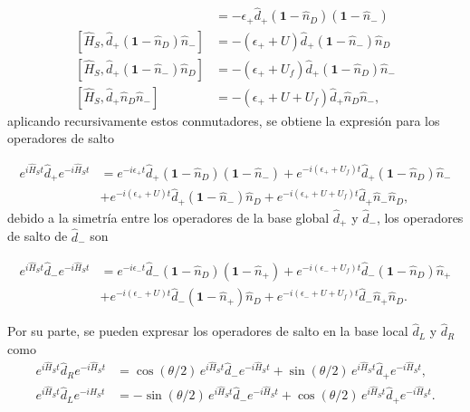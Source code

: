 \begin{appendixs}
\begin{align*}
    [\hat{H}_{S},\hat{d}_{+}(\textbf{1}-\hat{n}_{D})(\textbf{1} - \hat{n}_{-})] & = - \epsilon_{+}\hat{d}_{+}(\textbf{1}-\hat{n}_{D})(\textbf{1} - \hat{n}_{-}) \\
    [\hat{H}_{S},\hat{d}_{+}(\textbf{1}-\hat{n}_{D})\hat{n}_{-}] & = - (\epsilon_{+} + U)\hat{d}_{+}(\textbf{1} - \hat{n}_{-})\hat{n}_{D} \\
    [\hat{H}_{S},\hat{d}_{+}(\textbf{1}-\hat{n}_{-})\hat{n}_{D}] & = - (\epsilon_{+} + U_{f})\hat{d}_{+}(\textbf{1} - \hat{n}_{D})\hat{n}_{-} \\
    [\hat{H}_{S},\hat{d}_{+}\hat{n}_{D}\hat{n}_{-}] & = - (\epsilon_{+} + U + U_{f})\hat{d}_{+}\hat{n}_{D}\hat{n}_{-}, 
\end{align*}
aplicando recursivamente estos conmutadores, se obtiene la expresión para los operadores de salto 

\begin{align*}
    e^{i \hat{H}_{S}t}\hat{d}_{+}e^{-i\hat{H}_{S}t} & = e^{-i\epsilon_{+}t}\hat{d}_{+}(\textbf{1}-\hat{n}_{D})(\textbf{1}-\hat{n}_{-}) + e^{-i(\epsilon_{+}+U_{f})t} \hat{d}_{+}(\textbf{1}-\hat{n}_{D})\hat{n}_{-} \\
    & + e^{-i(\epsilon_{+}+U)t}\hat{d}_{+}(\textbf{1}-\hat{n}_{-})\hat{n}_{D} + e^{-i(\epsilon_{+}+U+U_{f})t}\hat{d}_{+}\hat{n}_{-}\hat{n}_{D},
\end{align*}
debido a la simetría entre los operadores de la base global $\hat{d}_{+}$ y $\hat{d}_{-}$, los operadores de salto de $\hat{d}_{-}$ son

\begin{align*}
    e^{i \hat{H}_{S}t}\hat{d}_{-}e^{-i\hat{H}_{S}t} & = e^{-i\epsilon_{-}t}\hat{d}_{-}(\textbf{1}-\hat{n}_{D})(\textbf{1}-\hat{n}_{+}) + e^{-i(\epsilon_{-}+U_{f})t} \hat{d}_{-}(\textbf{1}-\hat{n}_{D})\hat{n}_{+} \\
    & + e^{-i(\epsilon_{-}+U)t}\hat{d}_{-}(\textbf{1}-\hat{n}_{+})\hat{n}_{D} + e^{-i(\epsilon_{-}+U+U_{f})t}\hat{d}_{-}\hat{n}_{+}\hat{n}_{D}.
\end{align*}

Por su parte, se pueden expresar los operadores de salto en la base local $\hat{d}_{L}$ y $\hat{d}_{R}$ como 
\begin{align*}
    e^{i\hat{H}_{S}t}\hat{d}_{R}e^{-i\hat{H}_{S}t} & = \cos(\theta/2)\, e^{i\hat{H}_{S}t}\hat{d}_{-}e^{-i\hat{H}_{S}t} + \sin(\theta/2)\, e^{i\hat{H}_{S}t}\hat{d}_{+}e^{-i\hat{H}_{S}t}, \\
    e^{i\hat{H}_{S}t}\hat{d}_{L}e^{-i\hat{H}_{S}t} & = -\sin(\theta/2)\, e^{i\hat{H}_{S}t}\hat{d}_{-}e^{-i\hat{H}_{S}t} + \cos(\theta/2)\, e^{i\hat{H}_{S}t}\hat{d}_{+}e^{-i\hat{H}_{S}t}.
\end{align*}


\end{appendixs}
